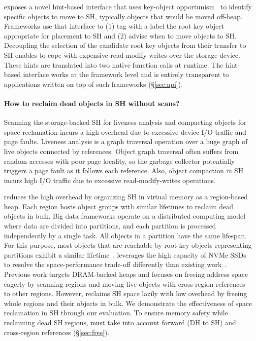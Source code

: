 \teraheapName{} exposes a novel hint-based interface that uses key-object
opportunism~\cite{hayes:key_opport} to identify specific objects to
move to SH, typically objects that would be moved off-heap. Frameworks
use that interface to (1) tag with a label the root key object
appropriate for placement to SH and (2) advise \teraheapName{} when to move
objects to SH. Decoupling the selection of the candidate root key
objects from their transfer to SH enables \teraheapName{} to cope with
expensive read-modify-writes over the storage device. These hints are
translated into two native function calls at runtime. The hint-based
interface works at the framework level and is entirely transparent to
applications written on top of such frameworks (\S\ref{sec:api}).

\paragraph{\textbf{How to reclaim dead objects in SH without \teraheapGC
scans?}}
Scanning the storage-backed SH for liveness analysis and compacting
objects for space reclamation incurs a high \teraheapGC overhead due to
excessive device I/O traffic and page faults.
Liveness analysis is a graph traversal operation over a huge graph of
live objects connected by references. Object graph traversal often
suffers from random accesses with poor page locality, so the garbage
collector potentially triggers a page fault as it follows each
reference. Also, object compaction in SH incurs high I/O
traffic due to excessive read-modify-writes operations.

\teraheapName{} reduces the high \teraheapGC{} overhead by organizing SH in virtual memory as a
region-based heap. Each region hosts object groups with similar lifetimes to
reclaim dead objects in bulk. Big data frameworks operate on a distributed
computing model where data are divided into partitions, and each partition is
processed independently by a single task. All objects in a partition have the
same lifespan. For this purpose, most objects that are reachable by root
key-objects representing partitions exhibit a similar lifetime~\cite{gog:broom}.
\teraheapName{} leverages the high capacity of NVMe SSDs to resolve the
space-performance trade-off differently than existing work~\cite{khanh:yak,
gog:broom}. Previous work targets DRAM-backed heaps and focuses on freeing
address space eagerly by scanning regions and moving live objects with
cross-region references to other regions. However, \teraheapName{} reclaims SH space
lazily with low overhead by freeing whole regions and their objects in bulk. We
demonstrate the effectiveness of space reclamation in SH through our evaluation.
To ensure memory safety while reclaiming dead SH regions, \teraheapName{} must take into
account forward (DH to SH) and cross-region references (\S\ref{sec:free}).

